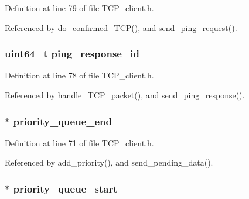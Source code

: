 Definition at line 79 of file T\+C\+P\+\_\+client.\+h.



Referenced by do\+\_\+confirmed\+\_\+\+T\+C\+P(), and send\+\_\+ping\+\_\+request().

\hypertarget{struct_t_c_p___client___connection_a39a52d8f19b6b09a91980f9798ec5b50}{
\subsubsection[{ping\+\_\+response\+\_\+id}]{\setlength{\rightskip}{0pt plus 5cm}uint64\+\_\+t ping\+\_\+response\+\_\+id}}\label{struct_t_c_p___client___connection_a39a52d8f19b6b09a91980f9798ec5b50}


Definition at line 78 of file T\+C\+P\+\_\+client.\+h.



Referenced by handle\+\_\+\+T\+C\+P\+\_\+packet(), and send\+\_\+ping\+\_\+response().

\hypertarget{struct_t_c_p___client___connection_a049dfdaebf54337c3024e077370c62d7}{
\subsubsection[{priority\+\_\+queue\+\_\+end}]{ $\ast$ priority\+\_\+queue\+\_\+end}}\label{struct_t_c_p___client___connection_a049dfdaebf54337c3024e077370c62d7}


Definition at line 71 of file T\+C\+P\+\_\+client.\+h.



Referenced by add\+\_\+priority(), and send\+\_\+pending\+\_\+data().

\hypertarget{struct_t_c_p___client___connection_a5e19017835c72dc03d9dfd9a93abeb3c}{
\subsubsection[{priority\+\_\+queue\+\_\+start}]{$\ast$ priority\+\_\+queue\+\_\+start}}\label{struct_t_c_p___client___connection_a5e19017835c72dc03d9dfd9a93abeb3c}


